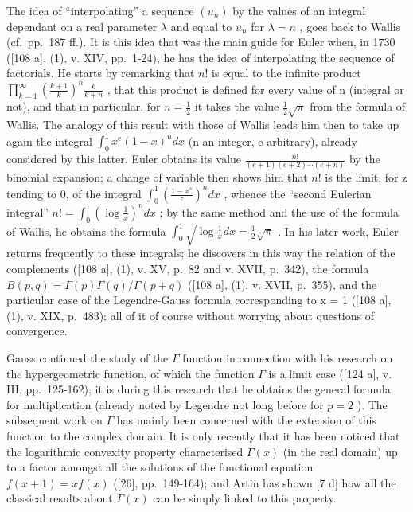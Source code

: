The idea of ``interpolating'' a sequence \((u_{n})\) by the values of an integral dependant on a real parameter \(\lambda\) and equal to \(u_{n}\) for \(\lambda = n\) , goes back to Wallis (cf.~pp.~187 ff.). It is this idea that was the main guide for Euler when, in 1730 ({[}108 a{]}, (1), v. XIV, pp.~1-24), he has the idea of interpolating the sequence of factorials. He starts by remarking that \(n!\) is equal to the infinite product \(\prod_{k=1}^{\infty}\left(\frac{k+1}{k}\right)^{n}\frac{k}{k+n}\) , that this product is defined for every value of n (integral or not), and that in particular, for \(n = \frac{1}{2}\) it takes the value \(\frac{1}{2}\sqrt{\pi}\) from the formula of Wallis. The analogy of this result with those of Wallis leads him then to take up again the integral \(\int_{0}^{1} x^{e}(1-x)^{n} dx\) (n an integer, e arbitrary), already considered by this latter. Euler obtains its value \(\frac{n!}{(e+1)(e+2)\cdots(e+n)}\) by the binomial expansion; a change of variable then shows him that \(n!\) is the limit, for z tending to 0, of the integral \(\int_{0}^{1}\left(\frac{1-x^{s}}{z}\right)^{n} dx\) , whence the ``second Eulerian integral'' \(n! = \int_{0}^{1}\left(\log\frac{1}{x}\right)^{n} dx\) ; by the same method and the use of the formula of Wallis, he obtains the formula \(\int_{0}^{1}\sqrt{\log\frac{1}{x}} dx = \frac{1}{2}\sqrt{\pi}\) . In his later work, Euler returns frequently to these integrals; he discovers in this way the relation of the complements ({[}108 a{]}, (1), v. XV, p.~82 and v. XVII, p.~342), the formula \(B(p,q) = \Gamma(p)\Gamma(q)/\Gamma(p+q)\) ({[}108 a{]}, (1), v. XVII, p.~355), and the particular case of the Legendre-Gauss formula corresponding to x = 1 ({[}108 a{]}, (1), v. XIX, p.~483); all of it of course without worrying about questions of convergence.

Gauss continued the study of the \(\Gamma\) function in connection with his research on the hypergeometric function, of which the function \(\Gamma\) is a limit case ({[}124 a{]}, v. III, pp.~125-162); it is during this research that he obtains the general formula for multiplication (already noted by Legendre not long before for \(p = 2\) ). The subsequent work on \(\Gamma\) has mainly been concerned with the extension of this function to the complex domain. It is only recently that it has been noticed that the logarithmic convexity property characterised \(\Gamma(x)\) (in the real domain) up to a factor amongst all the solutions of the functional equation \(f(x + 1) = xf(x)\) ({[}26{]}, pp.~149-164); and Artin has shown {[}7 d{]} how all the classical results about \(\Gamma(x)\) can be simply linked to this property.

